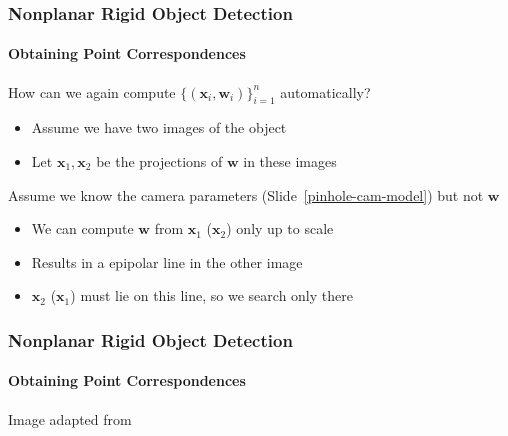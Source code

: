 \documentclass[xetex,professionalfont]{beamer}
\renewcommand{\vec}[1]{\ensuremath{\mathbf{#1}}}
\newcommand{\vw}{\vec{w}}
\newcommand{\vx}{\vec{x}}
\renewcommand\emph[1]{\textcolor{tuwcvl_inf_red}{#1}}
\begin{document}

\begin{frame}
\frametitle{Nonplanar Rigid Object Detection}
\framesubtitle{Obtaining Point Correspondences}

How can we again compute $\{(\vx_i,\vw_i)\}_{i=1}^n$ automatically?
\begin{itemize}
    \item Assume we have two images of the object
    \item Let $\vx_1,\vx_2$ be the projections of $\vw$ in these images
\end{itemize}

\bigskip
Assume we know the camera parameters (Slide~\ref{pinhole-cam-model}) but not $\vw$
\begin{itemize}
    \item We can compute $\vw$ from $\vx_1$ ($\vx_2$) only up to scale
    \item Results in a \emph{epipolar line} in the other image
    \item $\vx_2$ ($\vx_1$) must lie on this line, so we search only there
\end{itemize}

\end{frame}


\begin{frame}
\frametitle{Nonplanar Rigid Object Detection}
\framesubtitle{Obtaining Point Correspondences}

\begin{center}
    {\centering Image adapted from \cite{prince12}}
\end{center}

\end{frame}
\end{document}
